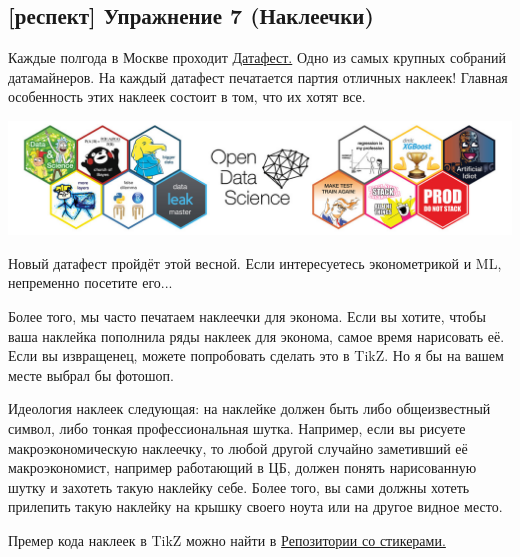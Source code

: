 \documentclass[12pt, a4paper, oneside]{article}
\begin{document}
\subsection*{[респект]  Упражнение 7  (Наклеечки)}

Каждые полгода в Москве проходит \href{http://datafest.ru/}{Датафест.} Одно из самых крупных собраний датамайнеров. На каждый датафест печатается партия отличных наклеек! Главная особенность этих наклеек состоит в том, что их хотят все.

\begin{center}
	\includegraphics[scale=0.35]{DF.jpg}
\end{center}

Новый датафест пройдёт этой весной. Если интересуетесь эконометрикой и ML, непременно посетите его... 

Более того, мы часто печатаем наклеечки для эконома.  Если вы хотите, чтобы ваша наклейка пополнила ряды наклеек для эконома, самое время нарисовать её. Если вы извращенец, можете попробовать сделать это в TikZ. Но я бы на вашем месте выбрал бы фотошоп. 

Идеология наклеек следующая: на наклейке должен быть либо общеизвестный символ, либо тонкая профессиональная шутка. Например, если вы рисуете макроэкономическую наклеечку, то любой другой случайно заметивший её макроэкономист, например работающий в ЦБ, должен понять нарисованную шутку и захотеть такую наклейку себе. Более того, вы сами должны хотеть прилепить такую наклейку на крышку своего ноута или на другое видное место.

Премер кода наклеек в TikZ можно найти в \href{https://github.com/FUlyankin/stickers}{Репозитории со стикерами.} 
\end{document}
